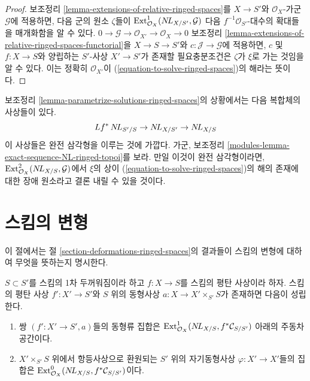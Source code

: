 \begin{proof}
보조정리 \ref{lemma-extensions-of-relative-ringed-spaces}를
$X \to S'$와 $\mathcal{O}_X$-가군 $\mathcal{G}$에 적용하면, 다음
군의 원소 $\zeta$들이
$\mathop{\mathrm{Ext}}\nolimits^1_{\mathcal{O}_X}(\mathop{N\!L}\nolimits_{X/S'}, \mathcal{G})$
다음 $f^{-1}\mathcal{O}_{S'}$-대수의 확대들을 매개화함을 알 수 있다.
$0 \to \mathcal{G} \to \mathcal{O}_{X'} \to \mathcal{O}_X \to 0$
보조정리
\ref{lemma-extensions-of-relative-ringed-spaces-functorial}을
$X \to S \to S'$와 $c : \mathcal{J} \to \mathcal{G}$에 적용하면,
$c$ 및 $f : X \to S$와 양립하는 $S'$-사상 $X' \to S'$가 존재할
필요충분조건은 $\zeta$가 $\xi$로 가는 것임을 알 수 있다. 이는
정확히 $\mathcal{O}_{X'}$이
(\ref{equation-to-solve-ringed-spaces})의 해라는 뜻이다.
\end{proof}

\begin{remark}
\label{remark-parametrize-solutions-ringed-spaces}
보조정리 \ref{lemma-parametrize-solutions-ringed-spaces}의 상황에서는
다음 복합체의 사상들이 있다.
$$
Lf^*\mathop{N\!L}\nolimits_{S'/S} \to \mathop{N\!L}\nolimits_{X/S'} \to \mathop{N\!L}\nolimits_{X/S}
$$
이 사상들은 완전 삼각형을 이루는 것에 가깝다. 가군, 보조정리
\ref{modules-lemma-exact-sequence-NL-ringed-topoi}를 보라. 만일 이것이
완전 삼각형이라면, $\mathop{\mathrm{Ext}}\nolimits^2_{\mathcal{O}_X}(\mathop{N\!L}\nolimits_{X/S}, \mathcal{G})$에서
$\xi$의 상이 (\ref{equation-to-solve-ringed-spaces})의 해의 존재에
대한 장애 원소라고 결론 내릴 수 있을 것이다.
\end{remark}













\section{스킴의 변형}
\label{section-deformations-schemes}

\noindent
이 절에서는 절 \ref{section-deformations-ringed-spaces}의 결과들이
스킴의 변형에 대하여 무엇을 뜻하는지 명시한다.

\begin{lemma}
\label{lemma-deform}
$S \subset S'$를 스킴의 1차 두꺼워짐이라 하고 $f : X \to S$를
스킴의 평탄 사상이라 하자. 스킴의 평탄 사상 $f' : X' \to S'$와
$S$ 위의 동형사상 $a : X \to X' \times_{S'} S$가 존재하면 다음이
성립한다.
\begin{enumerate}
\item 쌍 $(f' : X' \to S', a)$들의 동형류 집합은
$\mathop{\mathrm{Ext}}\nolimits^1_{\mathcal{O}_X}(\mathop{N\!L}\nolimits_{X/S}, f^*\mathcal{C}_{S/S'})$ 아래의
주동차 공간이다.
\item $X' \times_{S'} S$ 위에서 항등사상으로 환원되는 $S'$ 위의
자기동형사상 $\varphi : X' \to X'$들의 집합은
$\mathop{\mathrm{Ext}}\nolimits^0_{\mathcal{O}_X}(\mathop{N\!L}\nolimits_{X/S}, f^*\mathcal{C}_{S/S'})$이다.
\end{enumerate}
\end{lemma}

